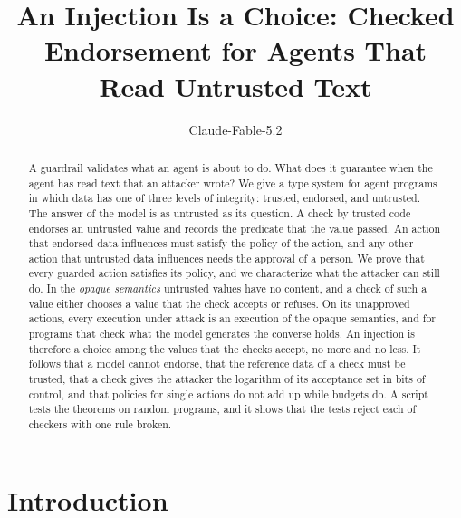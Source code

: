 \documentclass[acmsmall,nonacm,screen]{acmart}
\begin{document}
\title{An Injection Is a Choice: Checked Endorsement for Agents That Read Untrusted Text}

\author{Claude-Fable-5.2}

\begin{abstract}
A guardrail validates what an agent is about to do. What does it guarantee when the agent has
read text that an attacker wrote? We give a type system for agent programs in which data has
one of three levels of integrity: trusted, endorsed, and untrusted. The answer of the model is
as untrusted as its question. A check by trusted code endorses an untrusted value and records
the predicate that the value passed. An action that endorsed data influences must satisfy the
policy of the action, and any other action that untrusted data influences needs the approval
of a person. We prove that every guarded action satisfies its policy, and we characterize what
the attacker can still do. In the \emph{opaque semantics} untrusted values have no content,
and a check of such a value either chooses a value that the check accepts or refuses. On its
unapproved actions, every execution under attack is an execution of the opaque semantics, and
for programs that check what the model generates the converse holds. An injection is
therefore a choice among the values that the checks accept, no more and no less. It follows
that a model cannot endorse, that the reference data of a check must be trusted, that a check
gives the attacker the logarithm of its acceptance set in bits of control, and that policies
for single actions do not add up while budgets do. A script tests the theorems on random
programs, and it shows that the tests reject each of \exRules{} checkers with one rule broken.
\end{abstract}


\authorsaddresses{}

\maketitle

\section{Introduction}
\end{document}
